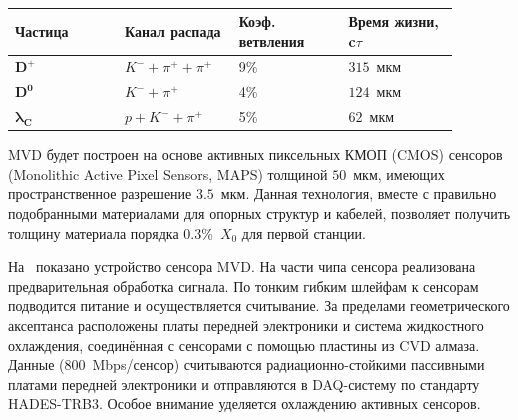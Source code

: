 \begin{table}[H]
\caption{}
\label{tabl:MVDphys}
\begin{tabular}{ | p{0.22\linewidth} | p{0.22\linewidth} | p{0.22\linewidth} | p{0.22\linewidth} | }
\hline
\textbf{Частица} & \textbf{Канал} \newline \textbf{распада} & \textbf{Коэф.} \newline \textbf{ветвления} & \textbf{Время жизни, c$\tau$} \\
\hline
$\mathbf{D^{+}}$ & $K^{-} + \pi^{+} + \pi^{+}$ & 9\% & $315$~мкм \\
\hline
$\mathbf{D^{0}}$ & $K^{-} + \pi^{+}$ & 4\% & $124$~мкм \\
\hline
$\mathbf{\lambda_{C}}$ & $p + K^{-} + \pi^{+}$ & 5\% & $62$~мкм \\
\hline
\end{tabular}
\end{table}

MVD будет построен на основе активных пиксельных КМОП (CMOS) сенсоров (Monolithic Active Pixel Sensors, MAPS) толщиной $50$~мкм, имеющих пространственное разрешение $3.5$~мкм. Данная технология, вместе с правильно подобранными материалами для опорных структур и кабелей, позволяет получить толщину материала порядка 0.3\%~$X_{0}$ для первой станции.




На~ показано устройство сенсора MVD.
На части чипа сенсора реализована предварительная обработка сигнала.
По тонким гибким шлейфам к сенсорам подводится питание и осуществляется считывание.
За пределами геометрического аксептанса расположены платы передней электроники и система жидкостного охлаждения, соединённая с сенсорами с помощью пластины из CVD алмаза.
Данные (800~Mbps/сенсор) считываются радиационно-стойкими пассивными платами передней электроники и отправляются в DAQ-систему по стандарту HADES-TRB3.
Особое внимание уделяется охлаждению активных сенсоров.

